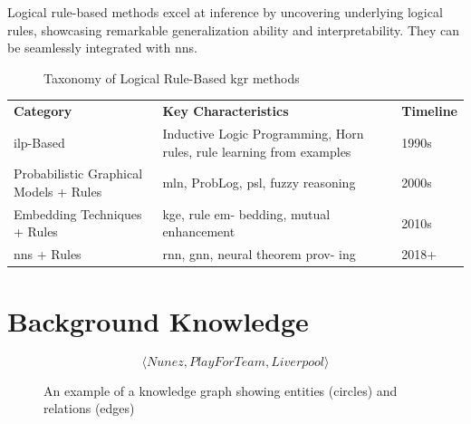 \begin{keyin}
    Logical rule-based methods excel at inference by uncovering underlying logical rules,
    showcasing remarkable generalization ability and interpretability.
    They can be
    seamlessly integrated with \glspl{nn}.
\end{keyin}

\begin{figure}[H]
    \caption{Taxonomy of Logical Rule-Based \gls{kgr} methods}\label{fig:figure}
\end{figure}

\begin{mytable}
    \begin{tabular}{ p{3cm} p{7cm} p{2cm}}
        \textbf{Category} & \textbf{Key Characteristics} & \textbf{Timeline} \\
        \gls{ilp}-Based & Inductive Logic Programming, Horn rules, rule
        learning from examples & 1990s \\
        Probabilistic Graphical
        Models + Rules & \gls{mln}, ProbLog, \gls{psl}, fuzzy reasoning & 2000s \\
        Embedding Techniques
        + Rules & \gls{kge}, rule em-
        bedding, mutual enhancement & 2010s \\
        \glspl{nn} + Rules & \gls{rnn}, \gls{gnn}, neural theorem prov-
        ing & 2018+
    \end{tabular}\label{tab:table3}
\end{mytable}

\section{Background Knowledge}\label{sec:background-knowledge}


\begin{bsp} 
\[
    \langle Nunez, PlayForTeam, Liverpool \rangle
\]
\end{bsp}


\begin{figure}[H]
    \caption{An example of a knowledge graph showing entities (circles) and relations (edges)}\label{fig:figure2}
\end{figure}

